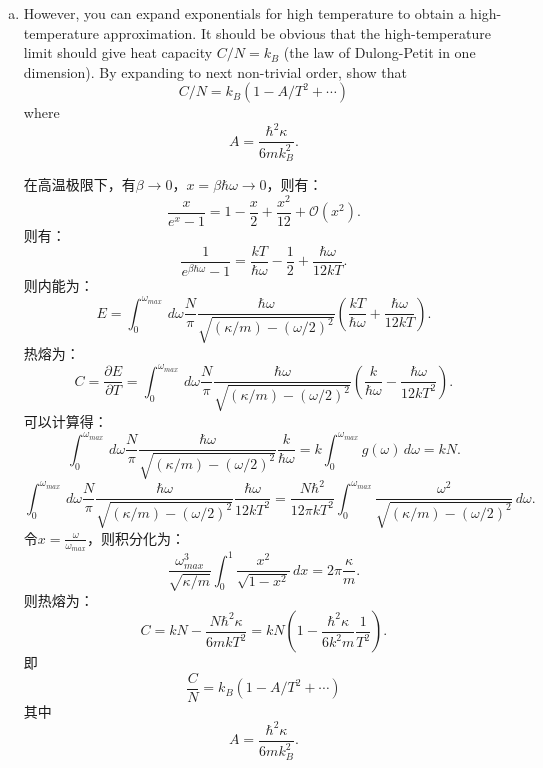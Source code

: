 \documentclass[reqno,a4paper,12pt]{amsart}
\begin{document}
\begin{enumerate}[(a)]
	\item However, you can expand exponentials for high temperature to obtain a high-temperature approximation. It should be obvious that the high-temperature limit should give heat capacity $C/N = k_B$ (the law of Dulong-Petit in one dimension). By expanding to next non-trivial order, show that 
	\[
		C/N = k_B(1-A/T^2+ \cdots)
	\]
	where
	\[
		A = \frac{\hbar^2\kappa}{6mk_B^2}.
	\]\begin{tcolorbox}[breakable, colback = black!5!white, colframe = black]
	在高温极限下，有$\beta \to 0$，$x = \beta\hbar\omega \to 0$，则有：
	\[
		\frac{x}{e^x-1} = 1 - \frac{x}{2} + \frac{x^2}{12} + \mathcal{O}(x^2).
	\]
	则有：
	\[
		\frac{1}{e^{\beta\hbar\omega}-1} = \frac{kT}{\hbar\omega} - \frac{1}{2} + \frac{\hbar\omega}{12kT}.
	\]
	则内能为：
	\[
		E = \int_0^{\omega_{max}} \,d\omega \frac{N}{\pi} \frac{\hbar\omega}{\sqrt{(\kappa/m) - (\omega/2)^2}} \left( \frac{kT}{\hbar\omega} + \frac{\hbar\omega}{12kT} \right).
	\]
	热熔为：
	\[
		C = \frac{\partial E}{\partial T} = \int_0^{\omega_{max}} \,d\omega \frac{N}{\pi} \frac{\hbar\omega}{\sqrt{(\kappa/m) - (\omega/2)^2}} \left( \frac{k}{\hbar\omega} - \frac{\hbar\omega}{12kT^2} \right).
	\]
	可以计算得：
	\[
		\int_0^{\omega_{max}} \,d\omega \frac{N}{\pi} \frac{\hbar\omega}{\sqrt{(\kappa/m) - (\omega/2)^2}} \frac{k}{\hbar\omega} = k\int_0^{\omega_{max}} g(\omega) \,d\omega = kN.
	\]
	\[
		\int_0^{\omega_{max}} \,d\omega \frac{N}{\pi} \frac{\hbar\omega}{\sqrt{(\kappa/m) - (\omega/2)^2}} \frac{\hbar\omega}{12kT^2} = \frac{N\hbar^2}{12\pi k T^2} \int_0^{\omega_{max}} \frac{\omega^2}{\sqrt{(\kappa/m) - (\omega/2)^2}}\,d\omega.
	\]
	令$x = \frac{\omega}{\omega_{max}}$，则积分化为：
	\[
		\frac{\omega_{max}^3}{\sqrt{\kappa/m}}\int_0^1 \frac{x^2}{\sqrt{1-x^2}}\,dx = 2\pi\frac{\kappa}{m}.
	\]
	则热熔为：
	\[
		C = kN - \frac{N\hbar^2\kappa}{6mkT^2} = kN \left( 1 - \frac{\hbar^2\kappa}{6k^2m} \frac{1}{T^2} \right).
	\]
	即
	\[
		\frac{C}{N} = k_B (1-A/T^2 + \cdots)
	\]
	其中
	\[
		A = \frac{\hbar^2\kappa}{6mk_B^2}.
	\]
	\end{tcolorbox}
	
\end{enumerate}
\end{document}
